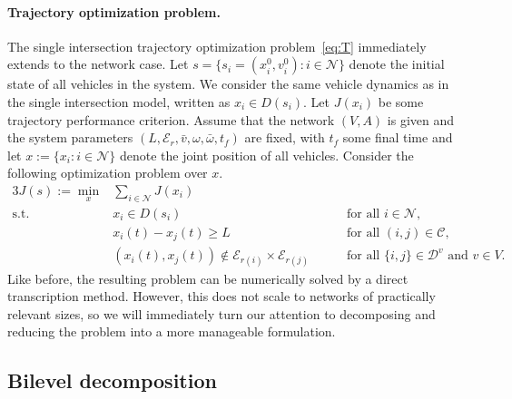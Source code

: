 \documentclass[a4paper]{report}
\theoremstyle{definition}
\theoremstyle{plain}
\begin{document}
\paragraph{Trajectory optimization problem.}

The single intersection trajectory optimization problem~\eqref{eq:T} immediately
extends to the network case.
%
Let $s = \{ s_i = (x_i^0, v_i^0) : i \in \mathcal{N} \}$ denote the initial
state of all vehicles in the system. We consider the same vehicle dynamics as in
the single intersection model, written as $x_i \in D(s_i)$.
%
Let $J(x_i)$ be some trajectory performance criterion. Assume that the network
$(V,A)$ is given and the system parameters
$(L, \mathcal{E}_r, \bar{v}, \omega, \bar{\omega}, t_f)$ are fixed, with $t_f$
some final time and let $x := \{ x_i : i \in \mathcal{N} \}$ denote the joint
position of all vehicles. Consider the following optimization problem over $x$.
%
\begin{alignat}{3}\label{eq:N}
  J(s) := \min_x & \sum_{i \in \mathcal{N}} J(x_i) \tag{NT} \\
      \text{s.t. }&  x_i \in D(s_i) && \quad \text{ for all } i \in \mathcal{N} , \tag{NT.1} \\
                       &  x_i(t) - x_j(t) \geq L && \quad \text{ for all } (i,j) \in \mathcal{C} , \tag{NT.2} \\
                       &  (x_i(t), x_j(t)) \notin \mathcal{E}_{r(i)} \times \mathcal{E}_{r(j)} && \quad \text{ for all } \{i,j\} \in \mathcal{D}^v \text{ and  } v \in V . \tag{NT.3}
\end{alignat}
%
Like before, the resulting problem can be numerically solved by a direct
transcription method.
%
However, this does not scale to networks of practically relevant sizes, so we
will immediately turn our attention to decomposing and reducing the problem into
a more manageable formulation.

\subsection{Bilevel decomposition}
\end{document}
